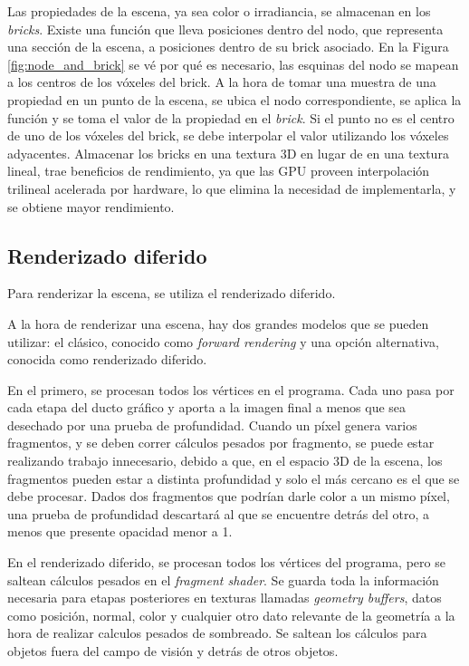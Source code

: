 Las propiedades de la escena, ya sea color o irradiancia, se almacenan en los \textit{bricks}.
Existe una función que lleva posiciones dentro del nodo, que representa una sección de la escena, a posiciones dentro de su brick asociado.
En la Figura \ref{fig:node_and_brick} se vé por qué es necesario, las esquinas del nodo se mapean a los centros de los vóxeles del brick.
A la hora de tomar una muestra de una propiedad en un punto de la escena, se ubica el nodo correspondiente, se aplica la función y se toma el valor de la propiedad en el \textit{brick}.
Si el punto no es el centro de uno de los vóxeles del brick, se debe interpolar el valor utilizando los vóxeles adyacentes.
Almacenar los bricks en una textura 3D en lugar de en una textura lineal, trae beneficios de rendimiento, ya que las GPU proveen interpolación trilineal acelerada por hardware, lo que elimina la necesidad de implementarla, y se obtiene mayor rendimiento.

\subsection{Renderizado diferido}\label{sec:deferred-rendering}

Para renderizar la escena, se utiliza el renderizado diferido.

A la hora de renderizar una escena, hay dos grandes modelos que se pueden utilizar: el clásico, conocido como \textit{forward rendering} y una opción alternativa, conocida como renderizado diferido.

En el primero, se procesan todos los vértices en el programa.
Cada uno pasa por cada etapa del ducto gráfico y aporta a la imagen final a menos que sea desechado por una prueba de profundidad.
Cuando un píxel genera varios fragmentos, y se deben correr cálculos pesados por fragmento, se puede estar realizando trabajo innecesario, debido a que, en el espacio 3D de la escena, los fragmentos pueden estar a distinta profundidad y solo el más cercano es el que se debe procesar.
Dados dos fragmentos que podrían darle color a un mismo píxel, una prueba de profundidad descartará al que se encuentre detrás del otro, a menos que presente opacidad menor a 1.

En el renderizado diferido, se procesan todos los vértices del programa, pero se saltean cálculos pesados en el \textit{fragment shader}.
Se guarda toda la información necesaria para etapas posteriores en texturas llamadas \textit{geometry buffers}, datos como posición, normal, color y cualquier otro dato relevante de la geometría a la hora de realizar calculos pesados de sombreado.
Se saltean los cálculos para objetos fuera del campo de visión y detrás de otros objetos.

